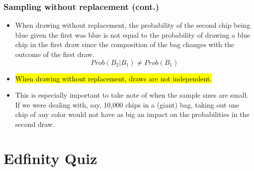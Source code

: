 \documentclass[slidestop,compress,mathserif]{beamer}
\newcommand{\soln}[1]{\textit{#1}}
\begin{document}
\begin{frame}
\frametitle{Sampling without replacement (cont.)}

\begin{itemize}

\item When drawing without replacement, the probability of the second chip being blue given the first was blue is not equal to the probability of drawing a blue chip in the first draw since the composition of the bag changes with the outcome of the first draw.
\[ Prob(B_2 | B_1) \ne Prob(B_1) \]

\pause

\item \hl{When drawing without replacement, draws are not independent.}

\pause

\item This is especially important to take note of when the sample sizes are small. If we were dealing with, say, 10,000 chips in a (giant) bag, taking out one chip of any color would not have as big an impact on the probabilities in the second draw.

\end{itemize}

\end{frame}








\section{Edfinity Quiz}
\end{document}
